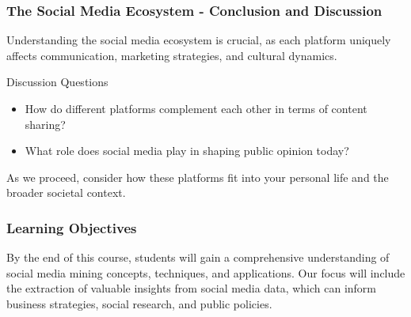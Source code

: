 \documentclass{beamer}
\begin{document}
\begin{frame}[fragile]
    \frametitle{The Social Media Ecosystem - Conclusion and Discussion}
    Understanding the social media ecosystem is crucial, as each platform uniquely affects communication, marketing strategies, and cultural dynamics. 

    \begin{block}{Discussion Questions}
        \begin{itemize}
            \item How do different platforms complement each other in terms of content sharing?
            \item What role does social media play in shaping public opinion today?
        \end{itemize}
    \end{block}
    
    As we proceed, consider how these platforms fit into your personal life and the broader societal context.
\end{frame}

\begin{frame}[fragile]
    \frametitle{Learning Objectives}
    By the end of this course, students will gain a comprehensive understanding of social media mining concepts, techniques, and applications. Our focus will include the extraction of valuable insights from social media data, which can inform business strategies, social research, and public policies.
\end{frame}
\end{document}
